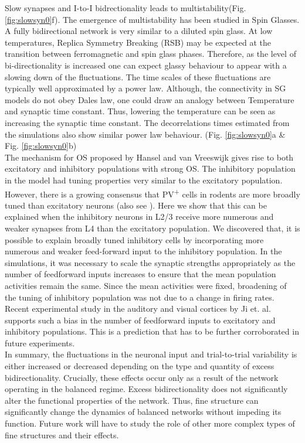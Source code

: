 Slow synapses and I-to-I bidrectionality leads to multistability(Fig. \ref{fig:slowsyn0}f). The emergence of multistability has been studied in Spin Glasses. A fully bidirectional network is very similar to a diluted spin glass\cite{megard1987spin}. At low temperatures, Replica Symmetry Breaking (RSB) may be expected at the transition between ferromagnetic and spin glass phases. Therefore, as the level of bi-directionality is increased one can expect glassy behaviour to appear with a slowing down of the fluctuations\cite{Crisanti1987, Crisanti1988}. The time scales of these fluctuations are typically well approximated by a power law. Although, the connectivity in SG models do not obey Dales law, one could draw an analogy between Temperature and synaptic time constant. Thus, lowering the temperature can be seen as increasing the synaptic time constant. The decorrelations times estimated from the simulations also show similar power law behaviour. (Fig. \ref{fig:slowsyn0}a \& Fig. \ref{fig:slowsyn0}b) \\

The mechanism for OS proposed by Hansel and van Vreeswijk gives rise to both excitatory and inhibitory populations with strong OS. The inhibitory population in the model had tuning properties very similar to the excitatory population. However, there is a growing consensus that PV\textsuperscript{+} cells in rodents are more broadly tuned than excitatory neurons \cite{niell2008highly, kerlin2010broadly, liu2009visual, sohya2007gabaergic, kameyama2010difference} (also see \cite{Runyan2010, Ma2010}). Here we show that this can be explained when the inhibitory neurons in L2/3 receive more numerous and weaker synapses from L4 than the excitatory population.  We discovered that, it is possible to explain broadly tuned inhibitory cells by incorporating more numerous and weaker feed-forward input to the inhibitory population. In the simulations, it was necessary to scale the synaptic strengths appropriately as the number of feedforward inputs increases to ensure that the mean population activities remain the same. Since the mean activities were fixed, broadening of the tuning of inhibitory population was not due to a change in firing rates. Recent experimental study in the auditory and visual cortices by Ji et. al. \cite{Ji2015} supports such a bias in the number of feedforward inputs to excitatory and inhibitory populations. This is a prediction that has to be further corroborated in future experiments. \\

In summary, the fluctuations in the neuronal input and trial-to-trial variability is either increased or decreased depending on the type and quantity of excess bidirectionality. Crucially, these effects occur only as a result of the network operating in the balanced regime. Excess bidirectionality does not significantly alter the functional properties of the network. Thus, fine structure can significantly change the dynamics of balanced networks without impeding its function. Future work will have to study the role of other more complex types of fine structures and their effects. 